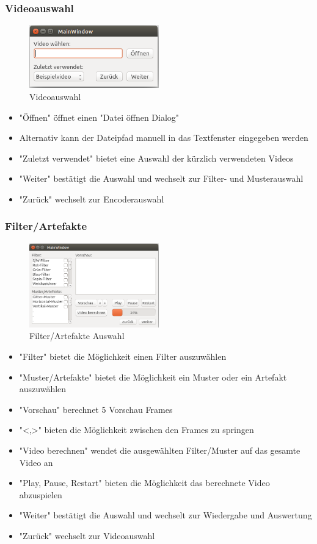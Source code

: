 \documentclass[parskip=full]{scrartcl}
\begin{document}
\subsubsection{Videoauswahl}
\begin{figure}[htbp] 
\centering
\includegraphics[width=0.5\textwidth]{GUI_Entwurf_1/GUI_2.png}
\caption{Videoauswahl}
\end{figure}
\begin{itemize}
\item "Öffnen" öffnet einen "Datei öffnen Dialog"
\item Alternativ kann der Dateipfad manuell in das Textfenster eingegeben werden
\item "Zuletzt verwendet" bietet eine Auswahl der kürzlich verwendeten Videos
\item "Weiter" bestätigt die Auswahl und wechselt zur Filter- und Musterauswahl
\item "Zurück" wechselt zur Encoderauswahl
\end{itemize}
\subsubsection{Filter/Artefakte}
\begin{figure}[htbp] 
\centering
\includegraphics[width=0.5\textwidth]{GUI_Entwurf_1/GUI_3.png}
\caption{Filter/Artefakte Auswahl}
\end{figure}
\begin{itemize}
\item "Filter" bietet die Möglichkeit einen Filter auszuwählen
\item "Muster/Artefakte" bietet die Möglichkeit ein Muster oder ein Artefakt auszuwählen
\item "Vorschau" berechnet 5 Vorschau Frames
\item "<,>" bieten die Möglichkeit zwischen den Frames zu springen
\item "Video berechnen" wendet die ausgewählten Filter/Muster auf das gesamte Video an
\item "Play, Pause, Restart" bieten die Möglichkeit das berechnete Video abzuspielen
\item "Weiter" bestätigt die Auswahl und wechselt zur Wiedergabe und Auswertung
\item "Zurück" wechselt zur Videoauswahl
\end{itemize}
\end{document}
